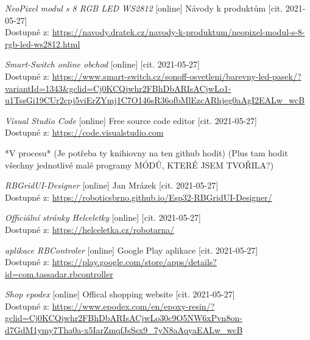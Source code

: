 \begin{thebibliography}{99}
\textit{NeoPixel modul s 8 RGB LED WS2812} [online] Návody k produktům [cit. 2021-05-27] \\
Dostupné z: \url{https://navody.dratek.cz/navody-k-produktum/neopixel-modul-s-8-rgb-led-ws2812.html}



\textit{Smart-Switch online obchod} [online]  [cit. 2021-05-27] \\
Dostupné z: \url{https://www.smart-switch.cz/sonoff-osvetleni/barevny-led-pasek/?variantId=1343&gclid=Cj0KCQjwhr2FBhDbARIsACjwLo1-u1TssGi19CUr2cpj5viErZYmj1C7O146sR36ofbMlEzcARhjeg0aAgI2EALw_wcB}

\textit{Visual Studio Code} [online] Free source code editor [cit. 2021-05-27] \\
Dostupné z: \url{https://code.visualstudio.com} 


*V procesu* (Je potřeba ty knihiovny na ten github hodit)
(Plus tam hodit všechny jednotlivé malé programy MÓDŮ, KTERÉ JSEM TVOŘILA?)




\textit{RBGridUI-Designer} [online] Jan Mrázek [cit. 2021-05-27] \\
Dostupné z: \url{https://roboticsbrno.github.io/Esp32-RBGridUI-Designer/} 

\textit {Officiální stránky Helceletky} [online] [cit. 2021-05-27] \\
Dostupné z: \url{https://helceletka.cz/robotarna/}


\textit{aplikace RBControler} [online] Google Play aplikace [cit. 2021-05-27] \\
Dostupné z: \url{https://play.google.com/store/apps/details?id=com.tassadar.rbcontroller}

\textit{Shop epodex} [online] Offical shopping website [cit. 2021-05-27] \\
Dostupné z: \url{https://www.epodex.com/en/epoxy-resin/?gclid=Cj0KCQjwhr2FBhDbARIsACjwLo30c9O5NW6xPvn8on-d7GdM1ymy7Tha0a-x5IarZmqfJsSsx9_7yN8aAqyaEALw_wcB}

\end{thebibliography}
